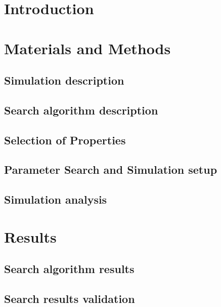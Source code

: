 \documentclass[metals,article,submit,pdftex,moreauthors]{Definitions/mdpi}
\begin{document}
\section{Introduction}
	

\section{Materials and Methods}
	
	\subsection{Simulation description}
	

	\subsection{Search algorithm description}
	

	\subsection{Selection of Properties}
	

	\subsection{Parameter Search and Simulation setup}
	

	\subsection{Simulation analysis}
	

\section{Results}
	\subsection{Search algorithm results}
	

	\subsection{Search results validation}
	
	\FloatBarrier
\end{document}
